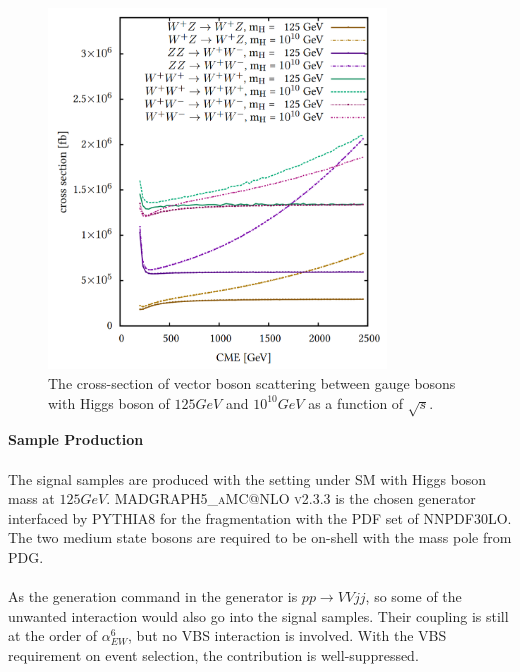 \begin{figure}[tbp]
	\begin{center}
		\includegraphics[width=0.8\textwidth,keepaspectratio]{Chapter5/VBSXS_heavyhiggs.png}
		\caption{The cross-section of vector boson scattering between gauge bosons with Higgs boson of $125GeV$ and $10^{10}GeV$ as a function of $\sqrt{s}$.\cite{Schnoor:2000941}}
		\label{Fig:VBSXS_heavyhiggs}
	\end{center}
\end{figure} 
\noindent
{\bf Sample Production}
\\
\\The signal samples are produced with the setting under SM with Higgs boson mass at $125GeV$. \textsc{MADGRAPH5\_aMC@NLO v2.3.3}\cite{Alwall:2014hca} is the chosen generator interfaced by \textsc{PYTHIA8}\cite{Sjostrand:2007gs} for the fragmentation with the PDF set of \textsc{NNPDF30LO}\cite{Ball:2012cx}. The two medium state bosons are required to be on-shell with the mass pole from PDG. 
\\
\\As the generation command in the generator is $pp \to VVjj$, so some of the unwanted interaction would also go into the signal samples. Their coupling is still at the order of $\alpha_{EW}^6$, but no VBS interaction is involved. With the VBS requirement on event selection, the contribution is well-suppressed. 
\noindent
